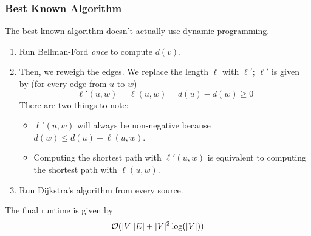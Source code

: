 \documentclass[letterpaper]{article}
\begin{document}
\subsubsection{Best Known Algorithm}
The best known algorithm doesn't actually use dynamic programming. 
\begin{enumerate}
    \item Run Bellman-Ford \emph{once} to compute $d(v)$. 
    \item Then, we reweigh the edges. We replace the length $\ell$ with $\ell'$; $\ell'$ is given by (for every edge from $u$ to $w$)
    \[\ell'(u, w) = \ell(u, w) = d(u) - d(w) \geq 0\]
    There are two things to note: 
    \begin{itemize}
        \item $\ell'(u, w)$ will always be non-negative because $d(w) \leq d(u) + \ell(u, w)$. 
        \item Computing the shortest path with $\ell'(u, w)$ is equivalent to computing the shortest path with $\ell(u, w)$. 
    \end{itemize}
    
    \item Run Dijkstra's algorithm from every source. 
\end{enumerate}
The final runtime is given by 
\[\mathcal{O}(|V||E| + |V|^2 \log(|V|))\]
\end{document}
